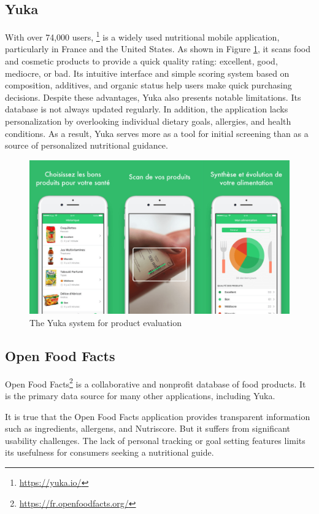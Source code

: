 \subsection{Yuka}
With over 74,000 users, \footnote{\url{https://yuka.io/}} is a widely used nutritional mobile application, particularly in France and the United States. As shown in Figure \ref{fig:yuka_evaluation}, it scans food and cosmetic products to provide a quick quality rating: excellent, good, mediocre, or bad. Its intuitive interface and simple scoring system based on composition, additives, and organic status help users make quick purchasing decisions. 
Despite these advantages, Yuka also presents notable limitations. Its database is not always updated regularly. In addition, the application lacks personalization by overlooking individual dietary goals, allergies, and health conditions. As a result, Yuka serves more as a tool for initial screening than as a source of personalized nutritional guidance.
\begin{center}
\begin{figure}[H]
\includegraphics[scale=0.33]{images/yuka_evaluation.png}
\caption{The Yuka system for product evaluation}
\label{fig:yuka_evaluation}
\end{figure}
\end{center}

\subsection{ Open Food Facts}
Open Food Facts\footnote{\url{https://fr.openfoodfacts.org/}} is a collaborative and nonprofit database of food products. It is the primary data source for many other applications, including Yuka. 

It is true that the Open Food Facts application provides transparent information such as ingredients, allergens, and Nutriscore. But it suffers from significant usability challenges. The lack of personal tracking or goal setting features limits its usefulness for consumers seeking a nutritional guide.

